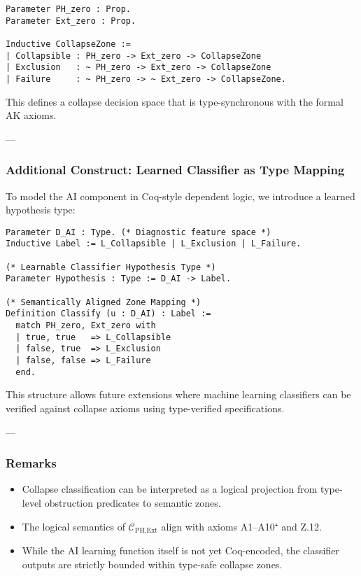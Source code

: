 \documentclass[11pt]{article}
\begin{document}
\begin{axiom}
\begin{axiom}
{{\begin{lstlisting}[language=Coq, caption=Collapse Zone Typing via PH and Ext Flags]
Parameter PH_zero : Prop.
Parameter Ext_zero : Prop.

Inductive CollapseZone :=
| Collapsible : PH_zero -> Ext_zero -> CollapseZone
| Exclusion   : ~ PH_zero -> Ext_zero -> CollapseZone
| Failure     : ~ PH_zero -> ~ Ext_zero -> CollapseZone.
\end{lstlisting}

This defines a collapse decision space that is type-synchronous with the formal AK axioms.

---

\subsubsection*{Additional Construct: Learned Classifier as Type Mapping}

To model the AI component in Coq-style dependent logic, we introduce a learned hypothesis type:

\begin{lstlisting}[language=Coq, caption=Classifier Hypothesis Type and Mapping]
Parameter D_AI : Type. (* Diagnostic feature space *)
Inductive Label := L_Collapsible | L_Exclusion | L_Failure.

(* Learnable Classifier Hypothesis Type *)
Parameter Hypothesis : Type := D_AI -> Label.

(* Semantically Aligned Zone Mapping *)
Definition Classify (u : D_AI) : Label :=
  match PH_zero, Ext_zero with
  | true, true   => L_Collapsible
  | false, true  => L_Exclusion
  | false, false => L_Failure
  end.
\end{lstlisting}

This structure allows future extensions where machine learning classifiers can be verified  
against collapse axioms using type-verified specifications.

---

\subsubsection*{Remarks}

\begin{itemize}
  \item Collapse classification can be interpreted as a logical projection from  
        type-level obstruction predicates to semantic zones.
  \item The logical semantics of \( \mathcal{C}_{\text{PH,Ext}} \) align with axioms A1–A10⁺ and Z.12.
  \item While the AI learning function itself is not yet Coq-encoded,  
        the classifier outputs are strictly bounded within type-safe collapse zones.
\end{itemize}

}}
\end{axiom}
\end{axiom}
\end{document}
